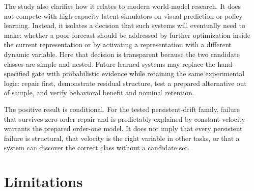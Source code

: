 \documentclass[10pt]{article}
\begin{document}
The study also clarifies how it relates to modern world-model research. It does not compete with high-capacity latent simulators on visual prediction or policy learning. Instead, it isolates a decision that such systems will eventually need to make: whether a poor forecast should be addressed by further optimization inside the current representation or by activating a representation with a different dynamic variable. Here that decision is transparent because the two candidate classes are simple and nested. Future learned systems may replace the hand-specified gate with probabilistic evidence while retaining the same experimental logic: repair first, demonstrate residual structure, test a prepared alternative out of sample, and verify behavioral benefit and nominal retention.

The positive result is conditional. For the tested persistent-drift family, failure that survives zero-order repair and is predictably explained by constant velocity warrants the prepared order-one model. It does not imply that every persistent failure is structural, that velocity is the right variable in other tasks, or that a system can discover the correct class without a candidate set.

\section{Limitations}
\end{document}
